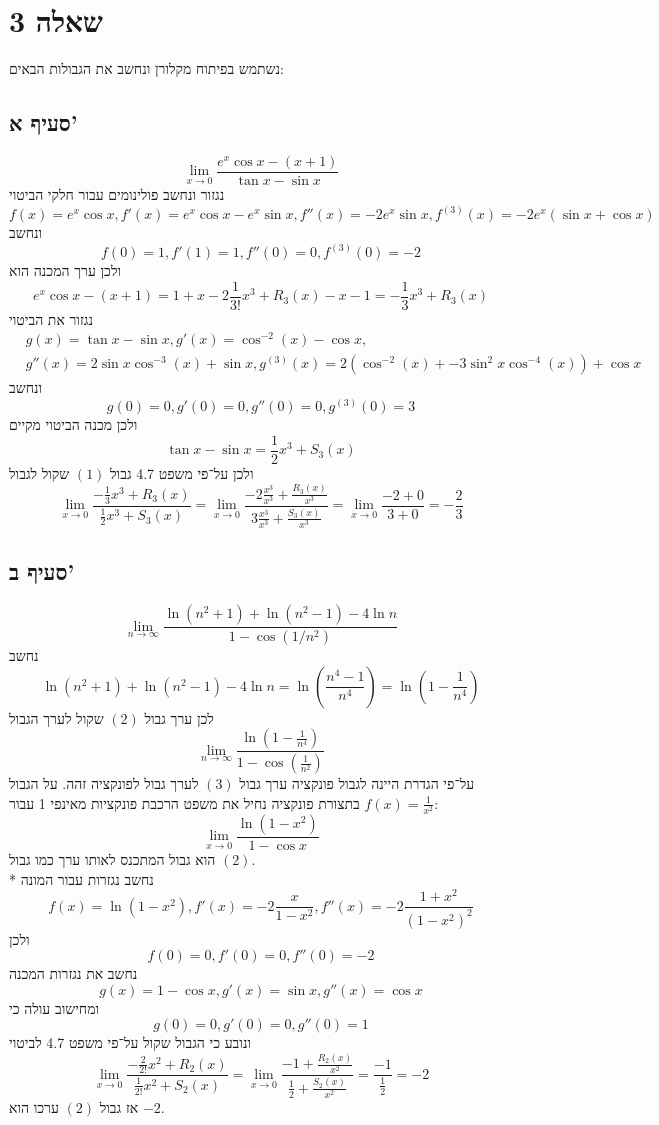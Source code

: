 \section{שאלה 3}
נשתמש בפיתוח מקלורן ונחשב את הגבולות הבאים:

\subsection{סעיף א'}
\[
	\lim_{x \to 0} \frac{e^x \cos x - (x + 1)}{\tan x - \sin x} \tag{1}
\]
נגזור ונחשב פולינומים עבור חלקי הביטוי
\[
	f(x) = e^x \cos x, f'(x) = e^x \cos x - e^x \sin x, f''(x) = -2 e^x \sin x, f^{(3)}(x) = -2 e^x ( \sin x + \cos x)
\]
ונחשב
\[
	f(0) = 1, f'(1) = 1, f''(0) = 0, f^{(3)}(0) = -2
\]
ולכן ערך המכנה הוא
\[
	e^x \cos x - (x + 1) = 1 + x - 2 \frac{1}{3!} x^3 + R_3(x) - x - 1 = -\frac{1}{3} x^3 + R_3(x)
\]
נגזור את הביטוי
\begin{align*}
	& g(x) = \tan x - \sin x,
	g'(x) = \cos^{-2}(x) - \cos x, \\
	& g''(x) = 2\sin x \cos^{-3}(x) + \sin x,
	g^{(3)}(x) = 2( \cos^{-2}(x) + -3 \sin^2 x \cos^{-4}(x) ) + \cos x
\end{align*}
ונחשב
\[
	g(0) = 0, g'(0) = 0, g''(0) = 0, g^{(3)}(0) = 3
\]
ולכן מכנה הביטוי מקיים
\[
	\tan x - \sin x = \frac{1}{2}x^3 + S_3(x)
\]
ולכן על־פי משפט 4.7 גבול $(1)$ שקול לגבול
\[
	\lim_{x \to 0} \frac{-\frac{1}{3} x^3 + R_3(x)}{\frac{1}{2} x^3 + S_3(x)}
	= \lim_{x \to 0} \frac{-2 \frac{x^3}{x^3} + \frac{R_3(x)}{x^3}}{3 \frac{x^3}{x^3} + \frac{S_3(x)}{x^3}}
	= \lim_{x \to 0} \frac{-2 + 0}{3 + 0}
	= -\frac{2}{3}
\]

\subsection{סעיף ב'}
\[
	\lim_{n \to \infty} \frac{\ln(n^2 + 1) + \ln(n^2 - 1) - 4 \ln n}{1 - \cos(1/n^2)} \tag{2}
\]
נחשב
\[
	\ln(n^2 + 1) + \ln(n^2 - 1) - 4 \ln n
	= \ln(\frac{n^4 - 1}{n^4})
	= \ln(1 - \frac{1}{n^4})
\]
לכן ערך גבול $(2)$ שקול לערך הגבול
\[
	\lim_{n \to \infty} \frac{\ln(1 - \frac{1}{n^4})}{1 - \cos(\frac{1}{n^2})} \tag{3}
\]
על־פי הגדרת היינה לגבול פונקציה ערך גבול $(3)$ לערך גבול לפונקציה זהה. על הגבול בתצורת פונקציה נחיל את משפט הרכבת פונקציות מאינפי 1 עבור $f(x) = \frac{1}{x^2}$:
\[
	\lim_{x \to 0} \frac{\ln(1 - x^2)}{1 - \cos x}
\]
הוא גבול המתכנס לאותו ערך כמו גבול $(2)$. \\*
נחשב נגזרות עבור המונה
\[
	f(x) = \ln(1 - x^2),
	f'(x) = -2\frac{x}{1 - x^2},
	f''(x) = -2\frac{1 + x^2}{{(1 - x^2)}^2}
\]
ולכן
\[
	f(0) = 0, f'(0) = 0, f''(0) = -2
\]
נחשב את נגזרות המכנה
\[
	g(x) = 1 - \cos x,
	g'(x) = \sin x,
	g''(x) = \cos x
\]
ומחישוב עולה כי
\[
	g(0) = 0, g'(0) = 0, g''(0) = 1
\]
ונובע כי הגבול שקול על־פי משפט 4.7 לביטוי
\[
	\lim_{x \to 0} \frac{-\frac{2}{2!} x^2 + R_2(x)}{\frac{1}{2!}x^2 + S_2(x)}
	= \lim_{x \to 0} \frac{-1 + \frac{R_2(x)}{x^2}}{\frac{1}{2} + \frac{S_2(x)}{x^2}}
	= \frac{-1}{\frac{1}{2} }
	= -2
\]
אז גבול $(2)$ ערכו הוא $-2$.

